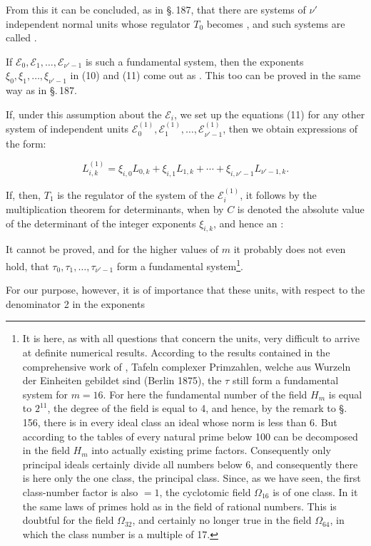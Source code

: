 
From this it can be concluded, as in \S.\,187, that there are systems of $\nu'$ independent normal units whose regulator $T_0$ becomes , and such systems are called .

If $\mathcal{E}_0, \mathcal{E}_1, \ldots, \mathcal{E}_{\nu'-1}$ is such a fundamental system, then the exponents $\xi_0, \xi_1, \ldots, \xi_{\nu'-1}$ in (10) and (11) come out as . This too can be proved in the same way as in \S.\,187.

If, under this assumption about the $\mathcal{E}_i$, we set up the equations (11) for any other system of independent units $\mathcal{E}_0^{(1)}, \mathcal{E}_1^{(1)}, \ldots, \mathcal{E}_{\nu'-1}^{(1)}$, then we obtain expressions of the form:

\[
L_{i,k}^{(1)} = \xi_{i,0} L_{0,k} + \xi_{i,1} L_{1,k} + \cdots + \xi_{i,\nu'-1} L_{\nu'-1,k}.
\]

If, then, $T_1$ is the regulator of the system of the $\mathcal{E}_i^{(1)}$, it follows by the multiplication theorem for determinants, when by $C$ is denoted the absolute value of the determinant of the integer exponents $\xi_{i,k}$, and hence an :


It cannot be proved, and for the higher values of $m$ it probably does not even hold, that $\tau_0, \tau_1, \ldots, \tau_{\nu'-1}$ form a fundamental system\footnote{It is here, as with all questions that concern the units, very difficult to arrive at definite numerical results. According to the results contained in the comprehensive work of , \glqq Tafeln complexer Primzahlen, welche aus Wurzeln der Einheiten gebildet sind\grqq{} (Berlin 1875), the $\tau$ still form a fundamental system for $m=16$. For here the fundamental number of the field $H_m$ is equal to $2^{11}$, the degree of the field is equal to 4, and hence, by the remark to \S.\,156, there is in every ideal class an ideal whose norm is less than 6. But according to the tables of  every natural prime below 100 can be decomposed in the field $H_m$ into actually existing prime factors. Consequently only principal ideals certainly divide all numbers below 6, and consequently there is here only the one class, the principal class. Since, as we have seen, the first class-number factor is also $=1$, the cyclotomic field $\Omega_{16}$ is of one class. In it the same laws of primes hold as in the field of rational numbers. This is doubtful for the field $\Omega_{32}$, and certainly no longer true in the field $\Omega_{64}$, in which the class number is a multiple of 17.}.

For our purpose, however, it is of importance that these units, with respect to the denominator 2 in the exponents
